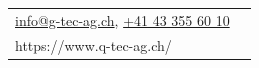 \begin{titlepage}
\begin{flushleft}
\end{flushleft}

\begin{tabularx}{\textwidth}{p{13cm} p{3cm}}	
	\href{mailto:info@q-tec-ag.ch}{\color{CorpColor}info@g-tec-ag.ch}, \href{tel:0041433556010}{\color{CorpColor}+41 43 355 60 10}& \qrcode{\\https://www.q-tec-ag.ch/}\\
\end{tabularx}






\end{titlepage}
